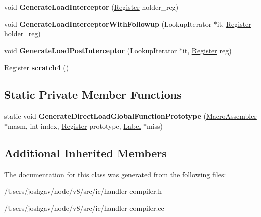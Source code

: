 \begin{DoxyCompactItemize}
\item 
void {\bfseries Generate\+Load\+Interceptor} (\hyperlink{structv8_1_1internal_1_1_register}{Register} holder\+\_\+reg)\hypertarget{classv8_1_1internal_1_1_named_load_handler_compiler_a9ba4d08f6fa7a48afa052b5b784d3dce}{}\label{classv8_1_1internal_1_1_named_load_handler_compiler_a9ba4d08f6fa7a48afa052b5b784d3dce}

\item 
void {\bfseries Generate\+Load\+Interceptor\+With\+Followup} (Lookup\+Iterator $\ast$it, \hyperlink{structv8_1_1internal_1_1_register}{Register} holder\+\_\+reg)\hypertarget{classv8_1_1internal_1_1_named_load_handler_compiler_a69d712ea48657a485dc2350939f59fb4}{}\label{classv8_1_1internal_1_1_named_load_handler_compiler_a69d712ea48657a485dc2350939f59fb4}

\item 
void {\bfseries Generate\+Load\+Post\+Interceptor} (Lookup\+Iterator $\ast$it, \hyperlink{structv8_1_1internal_1_1_register}{Register} reg)\hypertarget{classv8_1_1internal_1_1_named_load_handler_compiler_acc4bb7afea47dae42696f1964cae720e}{}\label{classv8_1_1internal_1_1_named_load_handler_compiler_acc4bb7afea47dae42696f1964cae720e}

\item 
\hyperlink{structv8_1_1internal_1_1_register}{Register} {\bfseries scratch4} ()\hypertarget{classv8_1_1internal_1_1_named_load_handler_compiler_a0a81a065544af40f1911c3e717b96f2d}{}\label{classv8_1_1internal_1_1_named_load_handler_compiler_a0a81a065544af40f1911c3e717b96f2d}

\end{DoxyCompactItemize}
\subsection*{Static Private Member Functions}
\begin{DoxyCompactItemize}
\item 
static void {\bfseries Generate\+Direct\+Load\+Global\+Function\+Prototype} (\hyperlink{classv8_1_1internal_1_1_macro_assembler}{Macro\+Assembler} $\ast$masm, int index, \hyperlink{structv8_1_1internal_1_1_register}{Register} prototype, \hyperlink{classv8_1_1internal_1_1_label}{Label} $\ast$miss)\hypertarget{classv8_1_1internal_1_1_named_load_handler_compiler_a54cfda20929bfc4d1ccbc9bf25cd6431}{}\label{classv8_1_1internal_1_1_named_load_handler_compiler_a54cfda20929bfc4d1ccbc9bf25cd6431}

\end{DoxyCompactItemize}
\subsection*{Additional Inherited Members}


The documentation for this class was generated from the following files\+:\begin{DoxyCompactItemize}
\item 
/\+Users/joshgav/node/v8/src/ic/handler-\/compiler.\+h\item 
/\+Users/joshgav/node/v8/src/ic/handler-\/compiler.\+cc\end{DoxyCompactItemize}
